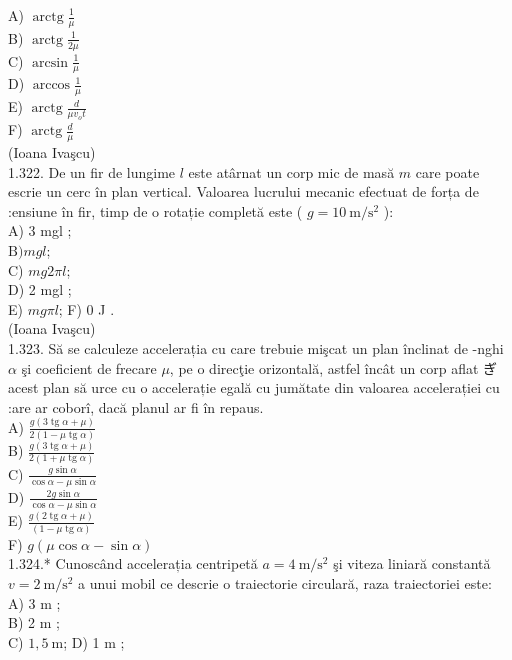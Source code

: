 {A) $\operatorname{arctg} \frac{1}{\mu}$\\
B) $\operatorname{arctg} \frac{1}{2 \mu}$\\
C) $\arcsin \frac{1}{\mu}$\\
D) $\arccos \frac{1}{\mu}$\\
E) $\operatorname{arctg} \frac{d}{\mu v_{o} t}$\\
F) $\operatorname{arctg} \frac{d}{\mu}$\\
(Ioana Ivaşcu)\\
1.322. De un fir de lungime $l$ este atârnat un corp mic de masă $m$ care poate escrie un cerc în plan vertical. Valoarea lucrului mecanic efectuat de forța de :ensiune în fir, timp de o rotație completă este ( $g=10 \mathrm{~m} / \mathrm{s}^{2}$ ):\\
A) 3 mgl ;\\
$\mathrm{B}) m g l$;\\
C) $m g 2 \pi l$;\\
D) 2 mgl ;\\
E) $m g \pi l$; F) 0 J .\\
(Ioana Ivaşcu)\\
1.323. Să se calculeze accelerația cu care trebuie mişcat un plan înclinat de -nghi $\alpha$ şi coeficient de frecare $\mu$, pe o direcţie orizontală, astfel încât un corp aflat ぎ acest plan să urce cu o accelerație egală cu jumătate din valoarea accelerației cu :are ar coborî, dacă planul ar fi în repaus.\\
A) $\frac{g(3 \operatorname{tg} \alpha+\mu)}{2(1-\mu \operatorname{tg} \alpha)}$\\
B) $\frac{g(3 \operatorname{tg} \alpha+\mu)}{2(1+\mu \operatorname{tg} \alpha)}$\\
C) $\frac{g \sin \alpha}{\cos \alpha-\mu \sin \alpha}$\\
D) $\frac{2 g \sin \alpha}{\cos \alpha-\mu \sin \alpha}$\\
E) $\frac{g(2 \operatorname{tg} \alpha+\mu)}{(1-\mu \operatorname{tg} \alpha)}$\\
F) $g(\mu \cos \alpha-\sin \alpha)$\\
1.324.* Cunoscând accelerația centripetă $a=4 \mathrm{~m} / \mathrm{s}^{2}$ şi viteza liniară constantă $v=2 \mathrm{~m} / \mathrm{s}^{2}$ a unui mobil ce descrie o traiectorie circulară, raza traiectoriei este:\\
A) 3 m ;\\
B) 2 m ;\\
C) $1,5 \mathrm{~m}$; D) 1 m ;\\
}
